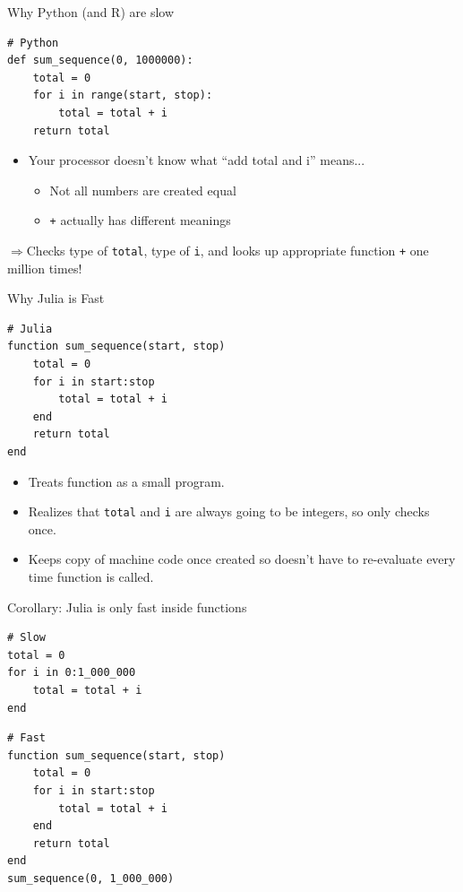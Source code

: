 \documentclass[11pt]{beamer}
\begin{document}
\begin{frame}[fragile, t]{Why Python (and R) are slow }
\begin{verbatim}
# Python
def sum_sequence(0, 1000000):
    total = 0
    for i in range(start, stop):
        total = total + i
    return total
\end{verbatim}
\pause
\begin{itemize}
    \item Your processor doesn't know what ``add total and i'' means...
    \begin{itemize}
        \pause \item Not all numbers are created equal
        \pause \item \texttt{+} actually has different meanings
    \end{itemize}
\end{itemize}
\pause
$\Rightarrow$Checks type of \texttt{total}, type of \texttt{i}, and looks up appropriate function \texttt{+} one million times!
\end{frame}

\begin{frame}[fragile, t]{Why Julia is Fast}
\begin{verbatim}
# Julia
function sum_sequence(start, stop)
    total = 0
    for i in start:stop
        total = total + i
    end
    return total
end
    \end{verbatim}
\begin{itemize}
    \pause \item  Treats function as a small program.
    \pause \item Realizes that \texttt{total} and \texttt{i} are always going to be integers, so only checks once.
    \pause \item Keeps copy of machine code once created so doesn't have to re-evaluate every time function is called.
\end{itemize}
\end{frame}

\begin{frame}[fragile]{Corollary: Julia is only fast inside functions}
\begin{verbatim}
# Slow
total = 0
for i in 0:1_000_000
    total = total + i
end
\end{verbatim}
\pause
\begin{verbatim}
# Fast
function sum_sequence(start, stop)
    total = 0
    for i in start:stop
        total = total + i
    end
    return total
end
sum_sequence(0, 1_000_000)
\end{verbatim}
\end{frame}
\end{document}
